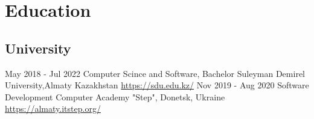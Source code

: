 \documentclass[11pt,a4paper]{moderncv}
\begin{document}
\section{Education}
  \subsection{University}
  \cventry
    {May 2018 - Jul 2022}
    {Computer Scince and Software, Bachelor}
    {Suleyman Demirel University,Almaty Kazakhstan}
    {}{\newline\url{https://sdu.edu.kz/}}{}
  \cventry
    {Nov 2019 - Aug 2020}
    {Software Development}
    {Computer Academy "Step", Donetsk, Ukraine}
    {}{\newline\url{https://almaty.itstep.org/}}{}
\end{document}
